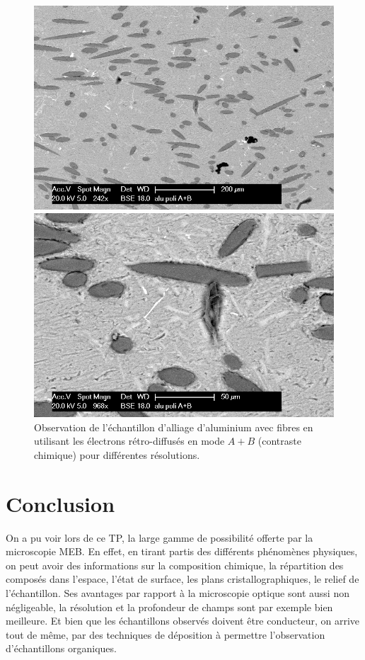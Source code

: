 \documentclass[a4paper,12pt]{article}
\begin{document}
\begin{figure}
\begin{minipage}[c]{.5\linewidth}
\centering
\includegraphics[width=1\textwidth]{images/alu_er_apb.png}
 \end{minipage}\hfill
\begin{minipage}[c]{.5\linewidth}
\centering
\includegraphics[width=1\textwidth]{images/alu_er_apb_g.png}
\end{minipage}
\caption{Observation de l'échantillon d'alliage d'aluminium avec fibres en utilisant les électrons rétro-diffusés en mode $A+B$ (contraste chimique) pour différentes résolutions.}
\label{fig:alu_poli_a+b}
\end{figure}




\section*{Conclusion}


On a pu voir lors de ce TP, la large gamme de possibilité offerte par la microscopie MEB. En effet, en tirant partis des différents phénomènes physiques, on peut avoir des informations sur la composition chimique, la répartition des composés dans l'espace, l'état de surface, les plans cristallographiques, le relief de l'échantillon. Ses avantages par rapport à la microscopie optique sont aussi non négligeable, la résolution et la profondeur de champs sont par exemple bien meilleure. Et bien que les échantillons observés doivent être conducteur, on arrive tout de même, par des techniques de déposition à permettre l'observation d'échantillons organiques.
\end{document}
